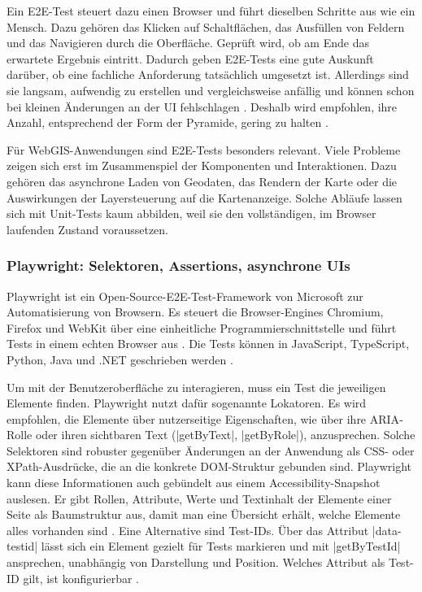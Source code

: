 Ein \ac{E2E}-Test steuert dazu einen Browser und führt dieselben Schritte aus wie ein Mensch. Dazu gehören das Klicken auf Schaltflächen, das Ausfüllen von Feldern und das Navigieren durch die Oberfläche. Geprüft wird, ob am Ende das erwartete Ergebnis eintritt. Dadurch geben \ac{E2E}-Tests eine gute Auskunft darüber, ob eine fachliche Anforderung tatsächlich umgesetzt ist. Allerdings sind sie langsam, aufwendig zu erstellen und vergleichsweise anfällig und können schon bei kleinen Änderungen an der \ac{UI} fehlschlagen \parencite{fowler_test_2012}. Deshalb wird empfohlen, ihre Anzahl, entsprechend der Form der Pyramide, gering zu halten \parencite{poenisch_testpyramide_2022}.

Für WebGIS-Anwendungen sind \ac{E2E}-Tests besonders relevant. Viele Probleme zeigen sich erst im Zusammenspiel der Komponenten und Interaktionen. Dazu gehören das asynchrone Laden von Geodaten, das Rendern der Karte oder die Auswirkungen der Layersteuerung auf die Kartenanzeige. Solche Abläufe lassen sich mit Unit-Tests kaum abbilden, weil sie den vollständigen, im Browser laufenden Zustand voraussetzen.

\subsubsection{Playwright: Selektoren, Assertions, asynchrone UIs}

Playwright ist ein Open-Source-\ac{E2E}-Test-Framework von Microsoft zur Automatisierung von Browsern. Es steuert die Browser-Engines Chromium, Firefox und WebKit über eine einheitliche Programmierschnittstelle und führt Tests in einem echten Browser aus \parencite[Playwright]{microsoft_fast_nodate}. Die Tests können in JavaScript, TypeScript, Python, Java und .NET geschrieben werden \parencite[Supported languages]{microsoft_supported_nodate}.

Um mit der Benutzeroberfläche zu interagieren, muss ein Test die jeweiligen Elemente finden. Playwright nutzt dafür sogenannte Lokatoren. Es wird empfohlen, die Elemente über nutzerseitige Eigenschaften, wie über ihre \ac{ARIA}-Rolle oder ihren sichtbaren Text (\code|getByText|, \code|getByRole|), anzusprechen. Solche Selektoren sind robuster gegenüber Änderungen an der Anwendung als \ac{CSS}- oder XPath-Ausdrücke, die an die konkrete \ac{DOM}-Struktur gebunden sind. Playwright kann diese Informationen auch gebündelt aus einem Accessibility-Snapshot auslesen. Er gibt Rollen, Attribute, Werte und Textinhalt der Elemente einer Seite als Baumstruktur aus, damit man eine Übersicht erhält, welche Elemente alles vorhanden sind \parencite[Snapshot testing]{microsoft_snapshot_nodate}. Eine Alternative sind Test-IDs. Über das Attribut \code|data-testid| lässt sich ein Element gezielt für Tests markieren und mit \code|getByTestId| ansprechen, unabhängig von Darstellung und Position. Welches Attribut als Test-ID gilt, ist konfigurierbar \parencite[Locators]{microsoft_locators_nodate}.

